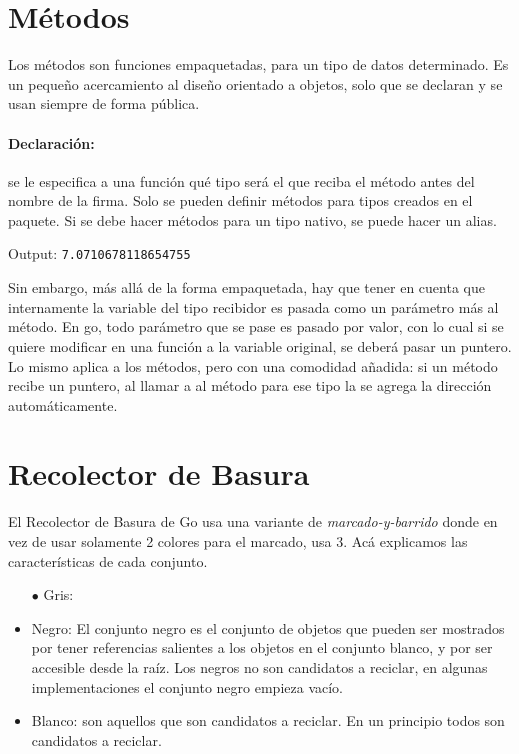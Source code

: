 \documentclass{article}
\begin{document}
\section{Métodos}
Los métodos son funciones empaquetadas, para un tipo de datos determinado. Es un pequeño acercamiento al diseño orientado a objetos, solo que se declaran y se usan siempre de forma pública.

\paragraph{Declaración:} se le especifica a una función qué tipo será el que reciba el método antes del nombre de la firma. Solo se pueden definir métodos para tipos creados en el paquete. Si se debe hacer métodos para un tipo nativo, se puede hacer un alias.


Output: \verb|7.0710678118654755|

Sin embargo, más allá de la forma empaquetada, hay que tener en cuenta que internamente la variable del tipo recibidor es pasada como un parámetro más al método. %
En go, todo parámetro que se pase es pasado por valor, con lo cual si se quiere modificar en una función a la variable original, se deberá pasar un puntero. Lo mismo aplica a los métodos, pero con una comodidad añadida: si un método recibe un puntero, al llamar a al método para ese tipo la se agrega la dirección automáticamente. %

\section{Recolector de Basura}
El Recolector de Basura de Go usa una variante de \textit{marcado-y-barrido} donde en vez de usar solamente 2 colores para el marcado, usa 3. 
Acá explicamos las características de cada conjunto.
\begin{itemize}
	\item[$\bullet$] Gris:
	\item Negro: El conjunto negro es el conjunto de objetos que pueden ser mostrados por tener referencias salientes a los objetos en el conjunto blanco, y por ser accesible desde la raíz. Los negros no son candidatos a reciclar, en algunas implementaciones el conjunto negro empieza vacío. 
	\item Blanco: son aquellos que son candidatos a reciclar. En un principio todos son candidatos a reciclar. 
\end{itemize}
\end{document}
